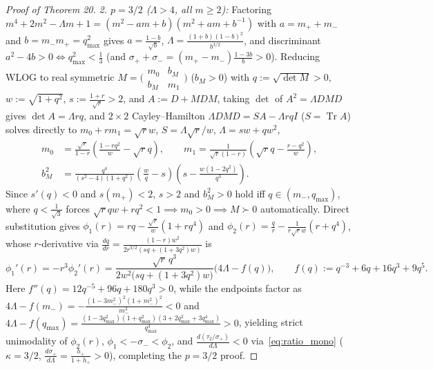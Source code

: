 \documentclass[10pt,letterpaper]{article}
\newcommand{\Tr}{\operatorname{Tr}}
\begin{document}
\begin{proof}[Proof of Theorem 20]
\emph{2. $p = 3/2$ ($\Lambda > 4$, all $m \ge 2$):} Factoring $m^4 + 2m^2 - \Lambda m + 1 = (m^2 - am + b)(m^2 + am + b^{-1})$ with $a = m_+ + m_-$ and $b = m_- m_+ = q_{\max}^2$ gives $a = \frac{1-b}{\sqrt{b}}$, $\Lambda = \frac{(1+b)(1-b)^2}{b^{3/2}}$, and discriminant $a^2 - 4b > 0 \iff q_{\max}^2 < \frac{1}{3}$ (and $\sigma_+ + \sigma_- = (m_+-m_-)\frac{1-3b}{b} > 0$). Reducing WLOG to real symmetric $M = \bigl(\begin{smallmatrix} m_0 & b_M \\ b_M & m_1 \end{smallmatrix}\bigr)$ ($b_M > 0$) with $q := \sqrt{\det M} > 0$, $w := \sqrt{1+q^2}$, $s := \frac{1+r}{\sqrt{r}} > 2$, and $A := D + MDM$, taking $\det$ of $A^2 = \Lambda DMD$ gives $\det A = \Lambda rq$, and $2\times 2$ Cayley--Hamilton $\Lambda DMD = S A - \Lambda rq I$ ($S = \Tr A$) solves directly to $m_0 + rm_1 = \sqrt{r}w$, $S = \Lambda\sqrt{r}/w$, $\Lambda = sw + qw^2$,
\begin{align*}
  m_0 &= \frac{\sqrt{r}}{1-r}\!\left(\frac{1-rq^2}{w} - \sqrt{r}q\right),
  \qquad
  m_1 = \frac{1}{\sqrt{r}(1-r)}\!\left(\sqrt{r}q - \frac{r-q^2}{w}\right), \\
  b_M^2 &= \frac{q^4}{(s^2-4)(1+q^2)}\!\left(\frac{w}{q} - s\right)\!\left(s - \frac{w(1-2q^2)}{q^3}\right).
\end{align*}
Since $s'(q) < 0$ and $s(m_+) < 2$, $s > 2$ and $b_M^2 > 0$ hold iff $q \in (m_-, q_{\max})$, where $q < \frac{1}{\sqrt{3}}$ forces $\sqrt{r}qw + rq^2 < 1 \implies m_0 > 0 \implies M \succ 0$ automatically. Direct substitution gives $\phi_1(r) = rq - \frac{\sqrt{r}}{w}(1+rq^4)$ and $\phi_2(r) = \frac{q}{r} - \frac{1}{r\sqrt{r}w}(r+q^4)$, whose $r$-derivative via $\frac{dq}{dr} = \frac{(1-r)w^2}{2r^{3/2}(sq+(1+3q^2)w)}$ is
\[
  \phi_1'(r) = -r^3\phi_2'(r) = \frac{\sqrt{r}\,q^3}{2w^2\bigl(sq + (1+3q^2)w\bigr)}\bigl(4\Lambda - f(q)\bigr),
  \qquad f(q) := q^{-3} + 6q + 16q^3 + 9q^5.
\]
Here $f''(q) = 12q^{-5} + 96q + 180q^3 > 0$, while the endpoints factor as $4\Lambda - f(m_-) = -\frac{(1-3m_-^2)^2(1+m_-^2)^2}{m_-^3} < 0$ and $4\Lambda - f(q_{\max}) = \frac{(1-3q_{\max}^2)(1+q_{\max}^2)(3+2q_{\max}^2+3q_{\max}^4)}{q_{\max}^3} > 0$, yielding strict unimodality of $\phi_2(r)$, $\phi_1 < -\sigma_- < \phi_2$, and $\frac{d(\tau_2/\sigma_+)}{d\Lambda} < 0$ via~\eqref{eq:ratio_mono} ($\kappa = 3/2$, $\frac{d\sigma_+}{d\Lambda} = \frac{h_+}{1+h_+} > 0$), completing the $p = 3/2$ proof.


\end{proof}
\end{document}
